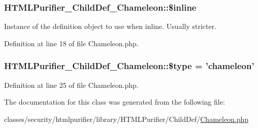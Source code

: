 \hypertarget{classHTMLPurifier__ChildDef__Chameleon_a6d23ca5b2646f664a68362715bbfb384}{
\subsubsection[{\$inline}]{\setlength{\rightskip}{0pt plus 5cm}H\+T\+M\+L\+Purifier\+\_\+\+Child\+Def\+\_\+\+Chameleon\+::\$inline}}\label{classHTMLPurifier__ChildDef__Chameleon_a6d23ca5b2646f664a68362715bbfb384}
Instance of the definition object to use when inline. Usually stricter. 

Definition at line 18 of file Chameleon.\+php.

\hypertarget{classHTMLPurifier__ChildDef__Chameleon_a17b07005a3f864b5820f1e3fb8aea132}{
\subsubsection[{\$type}]{\setlength{\rightskip}{0pt plus 5cm}H\+T\+M\+L\+Purifier\+\_\+\+Child\+Def\+\_\+\+Chameleon\+::\$type = 'chameleon'}}\label{classHTMLPurifier__ChildDef__Chameleon_a17b07005a3f864b5820f1e3fb8aea132}


Definition at line 25 of file Chameleon.\+php.



The documentation for this class was generated from the following file\+:\begin{DoxyCompactItemize}
\item 
classes/security/htmlpurifier/library/\+H\+T\+M\+L\+Purifier/\+Child\+Def/\hyperlink{Chameleon_8php}{Chameleon.\+php}\end{DoxyCompactItemize}
